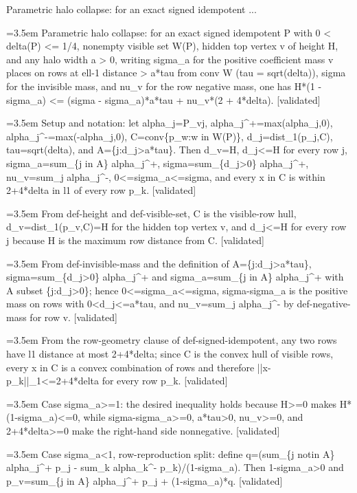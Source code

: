 \documentclass{article}
\newcommand{\step}[1]{\par\noindent\hangindent=3.5em\hangafter=1%
  \makebox[3.5em][l]{\textbf{#1.}}}
\newcommand{\steptag}[1]{\hfill{\small\textsf{[#1]}}}
\begin{document}
\begin{proofbox}{Parametric halo collapse: for an exact signed idempotent ...}
\step{1} Parametric halo collapse: for an exact signed idempotent P with 0 < delta(P) <= 1/4, nonempty visible set W(P), hidden top vertex v of height H, and any halo width a > 0, writing sigma\_a for the positive coefficient mass v places on rows at ell-1 distance > a*tau from conv W (tau = sqrt(delta)), sigma for the invisible mass, and nu\_v for the row negative mass, one has H*(1 - sigma\_a) <= (sigma - sigma\_a)*a*tau + nu\_v*(2 + 4*delta). \steptag{validated} \\[6pt]
\step{1.1} Setup and notation: let alpha\_j=P\_vj, alpha\_j\textasciicircum{}+=max(alpha\_j,0), alpha\_j\textasciicircum{}-=max(-alpha\_j,0), C=conv\{p\_w:w in W(P)\}, d\_j=dist\_1(p\_j,C), tau=sqrt(delta), and A=\{j:d\_j>a*tau\}. Then d\_v=H, d\_j<=H for every row j, sigma\_a=sum\_\{j in A\} alpha\_j\textasciicircum{}+, sigma=sum\_\{d\_j>0\} alpha\_j\textasciicircum{}+, nu\_v=sum\_j alpha\_j\textasciicircum{}-, 0<=sigma\_a<=sigma, and every x in C is within 2+4*delta in l1 of every row p\_k. \steptag{validated} \\[6pt]
\step{1.1.1} From def-height and def-visible-set, C is the visible-row hull, d\_v=dist\_1(p\_v,C)=H for the hidden top vertex v, and d\_j<=H for every row j because H is the maximum row distance from C. \steptag{validated} \\[4pt]
\step{1.1.2} From def-invisible-mass and the definition of A=\{j:d\_j>a*tau\}, sigma=sum\_\{d\_j>0\} alpha\_j\textasciicircum{}+ and sigma\_a=sum\_\{j in A\} alpha\_j\textasciicircum{}+ with A subset \{j:d\_j>0\}; hence 0<=sigma\_a<=sigma, sigma-sigma\_a is the positive mass on rows with 0<d\_j<=a*tau, and nu\_v=sum\_j alpha\_j\textasciicircum{}- by def-negative-mass for row v. \steptag{validated} \\[4pt]
\step{1.1.3} From the row-geometry clause of def-signed-idempotent, any two rows have l1 distance at most 2+4*delta; since C is the convex hull of visible rows, every x in C is a convex combination of rows and therefore ||x-p\_k||\_1<=2+4*delta for every row p\_k. \steptag{validated} \\[4pt]
\step{1.2} Case sigma\_a>=1: the desired inequality holds because H>=0 makes H*(1-sigma\_a)<=0, while sigma-sigma\_a>=0, a*tau>0, nu\_v>=0, and 2+4*delta>=0 make the right-hand side nonnegative. \steptag{validated} \\[4pt]
\step{1.3} Case sigma\_a<1, row-reproduction split: define q=(sum\_\{j notin A\} alpha\_j\textasciicircum{}+ p\_j - sum\_k alpha\_k\textasciicircum{}- p\_k)/(1-sigma\_a). Then 1-sigma\_a>0 and p\_v=sum\_\{j in A\} alpha\_j\textasciicircum{}+ p\_j + (1-sigma\_a)*q. \steptag{validated} \\[6pt]

\end{proofbox}
\end{document}
